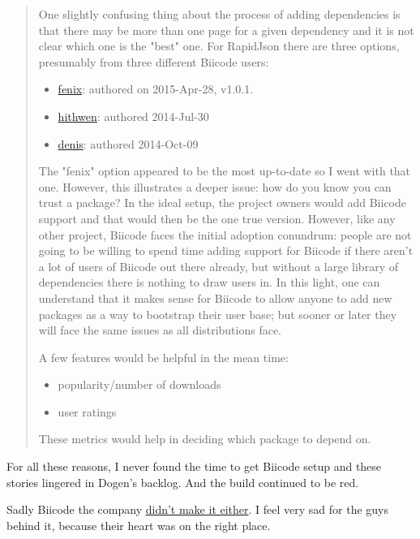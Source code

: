 \documentclass{book}
\begin{document}
\begin{quote}
One slightly confusing thing about the process of adding dependencies
is that there may be more than one page for a given dependency and it
is not clear which one is the "best" one. For RapidJson there are
three options, presumably from three different Biicode users:

\begin{itemize}
\item \href{https://www.biicode.com/fenix/rapidjson}{fenix}: authored on 2015-Apr-28, v1.0.1.
\item \href{https://www.biicode.com/hithwen/rapidjson}{hithwen}: authored 2014-Jul-30
\item \href{https://www.biicode.com/denis/rapidjson}{denis}: authored 2014-Oct-09
\end{itemize}

The "fenix" option appeared to be the most up-to-date so I went with
that one. However, this illustrates a deeper issue: how do you know
you can trust a package? In the ideal setup, the project owners would
add Biicode support and that would then be the one true
version. However, like any other project, Biicode faces the initial
adoption conundrum: people are not going to be willing to spend time
adding support for Biicode if there aren't a lot of users of Biicode
out there already, but without a large library of dependencies there
is nothing to draw users in. In this light, one can understand that it
makes sense for Biicode to allow anyone to add new packages as a way
to bootstrap their user base; but sooner or later they will face the
same issues as all distributions face.

A few features would be helpful in the mean time:

\begin{itemize}
\item popularity/number of downloads
\item user ratings
\end{itemize}

These metrics would help in deciding which package to depend on.
\end{quote}

For all these reasons, I never found the time to get Biicode setup and
these stories lingered in Dogen's backlog. And the build continued to
be red.

Sadly Biicode the company \href{http://blog.biicode.com/biicode-just-the-company-post-mortem/}{didn't make it either}. I feel very sad for
the guys behind it, because their heart was on the right place.
\end{document}

